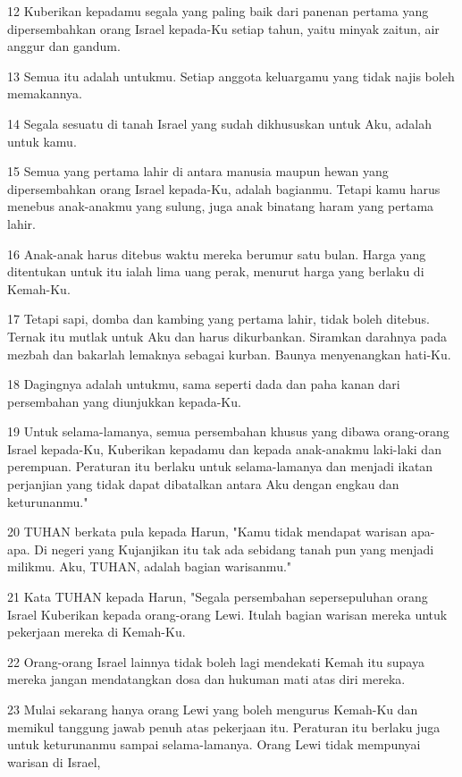 \par 12 Kuberikan kepadamu segala yang paling baik dari panenan pertama yang dipersembahkan orang Israel kepada-Ku setiap tahun, yaitu minyak zaitun, air anggur dan gandum.
\par 13 Semua itu adalah untukmu. Setiap anggota keluargamu yang tidak najis boleh memakannya.
\par 14 Segala sesuatu di tanah Israel yang sudah dikhususkan untuk Aku, adalah untuk kamu.
\par 15 Semua yang pertama lahir di antara manusia maupun hewan yang dipersembahkan orang Israel kepada-Ku, adalah bagianmu. Tetapi kamu harus menebus anak-anakmu yang sulung, juga anak binatang haram yang pertama lahir.
\par 16 Anak-anak harus ditebus waktu mereka berumur satu bulan. Harga yang ditentukan untuk itu ialah lima uang perak, menurut harga yang berlaku di Kemah-Ku.
\par 17 Tetapi sapi, domba dan kambing yang pertama lahir, tidak boleh ditebus. Ternak itu mutlak untuk Aku dan harus dikurbankan. Siramkan darahnya pada mezbah dan bakarlah lemaknya sebagai kurban. Baunya menyenangkan hati-Ku.
\par 18 Dagingnya adalah untukmu, sama seperti dada dan paha kanan dari persembahan yang diunjukkan kepada-Ku.
\par 19 Untuk selama-lamanya, semua persembahan khusus yang dibawa orang-orang Israel kepada-Ku, Kuberikan kepadamu dan kepada anak-anakmu laki-laki dan perempuan. Peraturan itu berlaku untuk selama-lamanya dan menjadi ikatan perjanjian yang tidak dapat dibatalkan antara Aku dengan engkau dan keturunanmu."
\par 20 TUHAN berkata pula kepada Harun, "Kamu tidak mendapat warisan apa-apa. Di negeri yang Kujanjikan itu tak ada sebidang tanah pun yang menjadi milikmu. Aku, TUHAN, adalah bagian warisanmu."
\par 21 Kata TUHAN kepada Harun, "Segala persembahan sepersepuluhan orang Israel Kuberikan kepada orang-orang Lewi. Itulah bagian warisan mereka untuk pekerjaan mereka di Kemah-Ku.
\par 22 Orang-orang Israel lainnya tidak boleh lagi mendekati Kemah itu supaya mereka jangan mendatangkan dosa dan hukuman mati atas diri mereka.
\par 23 Mulai sekarang hanya orang Lewi yang boleh mengurus Kemah-Ku dan memikul tanggung jawab penuh atas pekerjaan itu. Peraturan itu berlaku juga untuk keturunanmu sampai selama-lamanya. Orang Lewi tidak mempunyai warisan di Israel,
